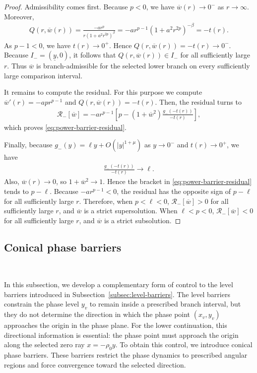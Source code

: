 \documentclass{amsart}
\theoremstyle{plain}
\theoremstyle{mainintrothm}
\theoremstyle{definition}
\begin{document}
	\begin{proof}
		Admissibility comes first.  Because $p<0$, we have
		$\overline w(r)\to0^-$ as $r\to\infty$.  Moreover,
		\begin{align*}
			Q(r,\overline w(r))
			=
			\frac{-ar^p}
			{r(1+a^2r^{2p})^\beta}
			=
			-ar^{p-1}(1+a^2r^{2p})^{-\beta}
			=
			-t(r).
		\end{align*}
		As $p-1<0$, we have $t(r)\to0^+$.  Hence
		$Q(r,\overline w(r))=-t(r)\to0^-$.  Because
		$I_-=(\underline y,0)$, it follows that
		$Q(r,\overline w(r))\in I_-$ for all sufficiently large $r$.  Thus
		$\overline w$ is branch-admissible for the selected lower branch on every
		sufficiently large comparison interval.
		
		\medskip
		
		It remains to compute the residual. For this purpose we compute $\overline w'(r)=-ap r^{p-1}$ and $Q(r,\overline w(r))=-t(r)$. Then, the residual turns to
		\begin{align*}
			\mathcal R_-[\overline w]
			=
			-ar^{p-1}
			\left[
			p
			-
			(1+\overline w^2)
			\frac{g_-(-t(r))}{-t(r)}
			\right],
		\end{align*}
		which proves \eqref{eq:power-barrier-residual}.
		\medskip
		
		Finally, because $g_-(y)=\ell y+O(|y|^{1+\mu})$ as $y\to0^-$ and
		$t(r)\to0^+$, we have
		\begin{align*}
			\frac{g_-(-t(r))}{-t(r)}
			\to
			\ell.
		\end{align*}
		Also, $\overline w(r)\to0$, so $1+\overline w^2\to1$.  Hence the bracket in
		\eqref{eq:power-barrier-residual} tends to $p-\ell$.  Because
		$-ar^{p-1}<0$, the residual has the opposite sign of $p-\ell$ for all
		sufficiently large $r$.  Therefore, when $p<\ell<0$,
		$\mathcal R_-[\overline w]>0$ for all sufficiently large $r$, and
		$\overline w$ is a strict supersolution.  When $\ell<p<0$,
		$\mathcal R_-[\overline w]<0$ for all sufficiently large $r$, and
		$\overline w$ is a strict subsolution.
	\end{proof}	
	
	\subsection{Conical phase barriers}\,
	\label{subsec:conical-phase-barriers}
	
In this subsection, we develop a complementary form of control to the level
barriers introduced in Subsection~\ref{subsec:level-barriers}.  The level
barriers constrain the phase level $y_v$ to remain inside a prescribed branch
interval, but they do not determine the direction in which the phase point
$(x_v,y_v)$ approaches the origin in the phase plane.  For the lower
continuation, this directional information is essential: the phase point must
approach the origin along the selected zero ray $x=-\rho_0 y$.  To obtain this
control, we introduce conical phase barriers.  These barriers restrict the phase
dynamics to prescribed angular regions and force convergence toward the
selected direction.
	
\end{document}
